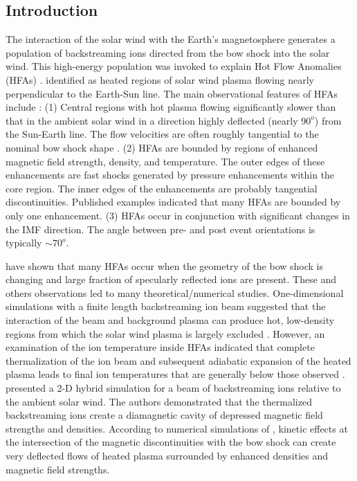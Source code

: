 \documentclass[11pt]{article}
\begin{document}
\begin{article}

\section{Introduction}

The interaction of the solar wind with the Earth's magnetosphere
generates a population of backstreaming ions directed from the
bow shock into the solar wind. This high-energy population was
invoked to explain Hot Flow Anomalies (HFAs)
\citep[e.g.][]{sw}. \citet{th} identified as heated regions of solar wind plasma
flowing nearly perpendicular to the Earth-Sun line.
The main observational features of HFAs include \citep[and others]{sw}: (1) Central regions with hot plasma flowing
significantly slower than that in the ambient solar wind in a
direction highly deflected (nearly $90^o$) from the Sun-Earth line.
The flow velocities are often roughly tangential to the nominal
bow shock shape \citep{sw}.
(2) HFAs are bounded by regions of enhanced
magnetic field strength, density, and temperature. The outer
edges of these enhancements are fast shocks generated by
pressure enhancements within the core region. The inner
edges of the enhancements are probably  tangential
discontinuities.
Published examples indicated that  many HFAs are bounded by only
one enhancement.
(3) HFAs occur in conjunction with significant changes in the IMF
direction. The angle between pre- and post event orientations is
typically $\sim 70^o$.

\citet{th} have shown that many
HFAs occur when the geometry of the bow shock is changing and large fraction
of specularly reflected ions are present. These and others
observations led to many theoretical/numerical studies.
One-dimensional simulations with a finite length backstreaming
ion beam suggested
that the interaction of the beam and background plasma can produce hot,
low-density regions from which the solar wind plasma is largely
excluded \citep{onb}. However, an
examination of the ion temperature inside HFAs indicated that
complete thermalization of the ion beam and subsequent adiabatic
expansion of the heated plasma leads to final ion temperatures that
are generally below those observed \citep{ona}. \citet{kl} presented
a 2-D hybrid simulation for a beam of backstreaming ions
relative to the ambient solar wind. The authors demonstrated that
the thermalized backstreaming ions create a diamagnetic cavity of
depressed magnetic field  strengths and densities.
According to numerical simulations of \citet{kl, li}, kinetic effects at the intersection of the magnetic
discontinuities with the bow shock can create very deflected
flows of heated plasma surrounded by enhanced densities and
magnetic field strengths.


\end{article}
\end{document}
